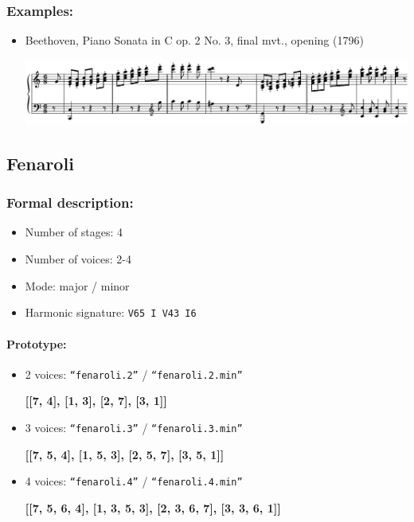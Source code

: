 \documentclass[11pt, openany]{article}
\begin{document}
\subsubsection{Examples:}
\begin{itemize}
\item Beethoven, Piano Sonata in C op. 2 No. 3, final mvt., opening (1796)
\begin{center}
\includegraphics[scale=0.6]{beethoven2.png}
\end{center}
\end{itemize}


	\subsection{Fenaroli}
	
\subsubsection{Formal description:}
\begin{itemize}
\item Number of stages: 4
\item Number of voices: 2-4
\item Mode: major / minor
\item Harmonic signature: \texttt{V65 I V43 I6}
\end{itemize}

\paragraph{Prototype:}
\begin{itemize}
\item 2 voices: \texttt{“fenaroli.2”} / \texttt{“fenaroli.2.min”}
	\begin{center}
	\textbf{[[7, 4], [1, 3], [2, 7], [3, 1]]}
	\end{center}
\item 3 voices: \texttt{“fenaroli.3”} / \texttt{“fenaroli.3.min”}
	\begin{center}
	\textbf{[[7, 5, 4], [1, 5, 3], [2, 5, 7], [3, 5, 1]]}
	\end{center}
\item 4 voices: \texttt{“fenaroli.4”} / \texttt{“fenaroli.4.min”}
	\begin{center}
	\textbf{[[7, 5, 6, 4], [1, 3, 5, 3], [2, 3, 6, 7], [3, 3, 6, 1]]}
	\end{center}
\end{itemize}
\end{document}
